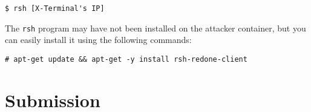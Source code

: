 \begin{lstlisting}
$ rsh [X-Terminal's IP]
\end{lstlisting}

The \texttt{rsh} program may have not been installed on the attacker container, 
but you can easily install it using the following commands:

\begin{lstlisting}
# apt-get update && apt-get -y install rsh-redone-client 
\end{lstlisting}


\section{Submission}










